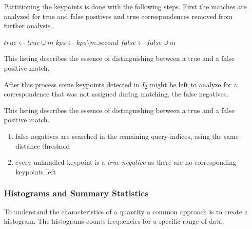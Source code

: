 Partitioning the keypoints is done with the following steps.
First the matches are analyzed for true and false positives and true correspondences removed from further analysis. 
\begin{algorithm}
\begin{algorithmic}[0]
        \State $true \gets true \cup m$
        \State $kps \gets kps \setminus m.second$
    \Else%
        \State $false \gets false \cup m$
    \EndIf%
    \EndFor%
    \EndFunction%
\end{algorithmic}
\caption{This listing describes the essence of distinguishing between a true and a false positive match.}
\end{algorithm}
After this process some keypoints detected in $I_2$ might be left to analyze for a correspondence that was not assigned during matching, the false negatives.
\begin{algorithmic}
        
    \EndFor%
    \EndFunction%
    \caption{This listing describes the essence of distinguishing between a true and a false positive match.}
\end{algorithmic}

\begin{enumerate}
    \item false negatives are searched in the remaining query-indices, using the same distance threshold
    \item every unhandled keypoint is a \emph{true-negative} as there are no corresponding keypoints left
\end{enumerate}

\subsubsection{Histograms and Summary Statistics}

To understand the characteristics of a quantity a common approach is to create a histogram.
The histograms counts frequencies for a specific range of data.

